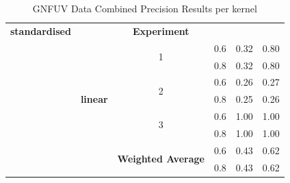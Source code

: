 \documentclass{mpaper}
\begin{document}
\begin{table}[]
\begin{tabular}{|c|c|cccc|}
\textbf{standardised}           &                       & \multicolumn{1}{c|}{\textbf{Experiment}}                        & \multicolumn{1}{c|}{}                   & \multicolumn{1}{l}{}              & \multicolumn{1}{l|}{}               \\ \cline{3-6} 
                                & \multicolumn{1}{l|}{} & \multicolumn{1}{c|}{\multirow{2}{*}{1}}                         & \multicolumn{1}{c|}{0.6}                & 0.32                              & 0.80                                \\
                                &                       & \multicolumn{1}{c|}{}                                           & \multicolumn{1}{c|}{0.8}                & 0.32                              & 0.80                                \\ \cline{3-6} 
                                &                       & \multicolumn{1}{c|}{\multirow{2}{*}{2}}                         & \multicolumn{1}{c|}{0.6}                & 0.26                              & 0.27                                \\
\multicolumn{1}{|l|}{}          & \textbf{linear}       & \multicolumn{1}{c|}{}                                           & \multicolumn{1}{c|}{0.8}                & 0.25                              & 0.26                                \\ \cline{3-6} 
                                &                       & \multicolumn{1}{c|}{\multirow{2}{*}{3}}                         & \multicolumn{1}{c|}{0.6}                & 1.00                              & 1.00                                \\
                                &                       & \multicolumn{1}{c|}{}                                           & \multicolumn{1}{c|}{0.8}                & 1.00                              & 1.00                                \\ \cline{3-6} 
                                &                       & \multicolumn{1}{c|}{\multirow{2}{*}{\textbf{Weighted Average}}} & \multicolumn{1}{c|}{0.6}                & 0.43                              & 0.62                                \\
                                &                       & \multicolumn{1}{c|}{}                                           & \multicolumn{1}{c|}{0.8}                & 0.43                              & 0.62                                \\ \hline
\end{tabular}
\caption{\label{tab:gnfuv_combined_precision_per_kernel} GNFUV Data Combined Precision Results per kernel}
\end{table}
\end{document}
